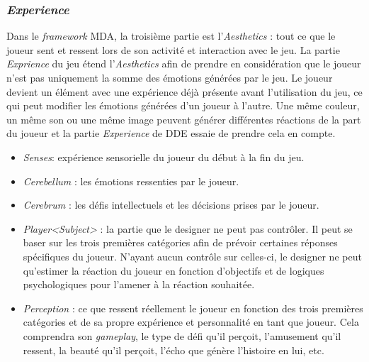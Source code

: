 \subsubsection*{\emph{Experience}}
    Dans le \emph{framework} MDA, la troisième partie est l'\emph{Aesthetics} : tout ce que le joueur sent et ressent lors de son activité et interaction avec le jeu. 
    La partie \emph{Exprience} du jeu étend l'\emph{Aesthetics} afin de prendre en considération que le joueur n'est pas uniquement la somme des émotions générées par le jeu. 
    Le joueur devient un élément avec une expérience déjà présente avant l'utilisation du jeu, ce qui peut modifier les émotions générées d'un joueur à l'autre. Une même couleur, un même son ou une même image peuvent générer différentes réactions de la part du joueur et la partie \emph{Experience} de DDE essaie de prendre cela en compte.
    \begin{itemize}
        \item \emph{Senses}: expérience sensorielle du joueur du début à la fin du jeu.
        \item \emph{Cerebellum} : les émotions ressenties par le joueur.
        \item \emph{Cerebrum} : les d\'efis intellectuels et les décisions prises par le joueur.
        \item \emph{Player<Subject>} : la partie que le designer ne peut pas contrôler. Il peut se baser sur les trois premières catégories afin de prévoir certaines réponses spécifiques du joueur. N'ayant aucun contrôle sur celles-ci, le designer ne peut qu'estimer la réaction du joueur en fonction d'objectifs et de logiques psychologiques pour l'amener à la réaction souhaitée.
        \item \emph{Perception} : ce que ressent réellement le joueur en fonction des trois premières catégories et de sa propre expérience et personnalité en tant que joueur. Cela comprendra son \emph{gameplay}, le type de d\'efi qu'il perçoit, l'amusement qu'il ressent, la beauté qu'il perçoit, l'écho que génère l'histoire en lui, etc.
    \end{itemize}


